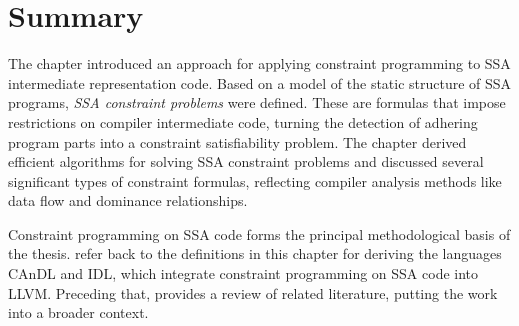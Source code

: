 \section{Summary}

    The chapter introduced an approach for applying constraint programming to
    SSA intermediate representation code.
    Based on a model of the static structure of SSA programs,
    {\it SSA constraint problems} were defined.
    These are formulas that impose restrictions on compiler intermediate code,
    turning the detection of adhering program parts into a constraint
    satisfiability problem.
    The chapter derived efficient algorithms for solving SSA constraint problems
    and discussed several significant types of constraint formulas, reflecting
    compiler analysis methods like data flow and dominance relationships.

    Constraint programming on SSA code forms the principal methodological basis
    of the thesis.
     refer back to the definitions in
    this chapter for deriving the languages CAnDL and IDL, which integrate
    constraint programming on SSA code into LLVM.
    Preceding that,  provides a review of related
    literature, putting the work into a broader context. 


    